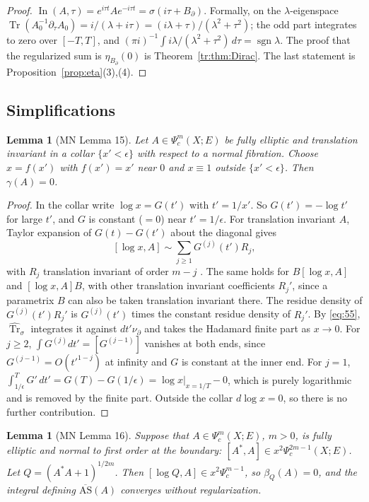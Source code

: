\documentclass[11pt,oneside,reqno]{article}
\DeclareMathOperator{\Tr}{Tr}
\DeclareMathOperator{\In}{In}
\DeclareMathOperator{\sgn}{sgn}
\newcommand{\Psic}{\Psi_{c}}
\newcommand{\hTrs}{\widehat{\Tr}_\sigma}
\newcommand{\lQ}{\log Q}
\newcommand{\lx}{\log x}
\newcommand{\bAS}{\overline{\mathrm{AS}}}
\theoremstyle{plain}
\newtheorem{lemma}[theorem]{Lemma}
\theoremstyle{definition}
\theoremstyle{remark}
\begin{document}
\begin{proof}
\(\In(A,\tau)=e^{i\tau t}Ae^{-i\tau t}=\sigma(i\tau+B_\partial)\). Formally,
on the \(\lambda\)-eigenspace
\(\Tr(A_0^{-1}\partial_\tau A_0)=i/(\lambda+i\tau)=(i\lambda+\tau)/
(\lambda^2+\tau^2)\); the odd part integrates to zero over \([-T,T]\), and
\((\pi i)^{-1}\int i\lambda/(\lambda^2+\tau^2)\,d\tau=\sgn\lambda\). The
proof that the regularized sum is \(\eta_{B_\partial}(0)\) is
Theorem~\ref{tr:thm:Dirac}. The last statement is
Proposition~\ref{prop:eta}(3),(4).
\end{proof}

\subsection{Simplifications}

\begin{lemma}[MN Lemma 15]\label{lem:gamma}
Let \(A\in\Psic^m(X;E)\) be fully elliptic and translation invariant in a
collar \(\{x'<\epsilon\}\) with respect to a normal fibration. Choose
\(x=f(x')\) with \(f(x')=x'\) near \(0\) and \(x\equiv1\) outside
\(\{x'<\epsilon\}\). Then \(\gamma(A)=0\).
\end{lemma}

\begin{proof}
In the collar write \(\log x=G(t')\) with \(t'=1/x'\). So
\(G(t')=-\log t'\) for large \(t'\), and \(G\) is constant (\(=0\)) near
\(t'=1/\epsilon\). For translation invariant \(A\), Taylor expansion of
\(G(t)-G(t')\) about the diagonal gives
\[
 [\lx,A]\sim\sum_{j\ge1}G^{(j)}(t')R_j ,
\]
with \(R_j\) translation invariant of order \(m-j\) \cite[p.~32]{MN}. The
same holds for \(B[\lx,A]\) and \([\lx,A]B\), with other translation
invariant coefficients \(R_j'\), since a parametrix \(B\) can also be
taken translation invariant there. The residue density of
\(G^{(j)}(t')R_j'\) is \(G^{(j)}(t')\) times the constant residue density
of \(R_j'\). By \eqref{eq:55}, \(\hTrs\) integrates it against
\(dt'\nu_\partial\) and takes the Hadamard finite part as \(x\to0\). For
\(j\ge2\), \(\int G^{(j)}dt'=[G^{(j-1)}]\) vanishes at both ends, since
\(G^{(j-1)}=O(t'^{1-j})\) at infinity and \(G\) is constant at the inner
end. For \(j=1\), \(\int_{1/\epsilon}^{T}G'\,dt'=G(T)-G(1/\epsilon)=
\log x|_{x=1/T}-0\), which is purely logarithmic and is removed by the
finite part. Outside the collar \(d\log x=0\), so there is no further
contribution.
\end{proof}

\begin{lemma}[MN Lemma 16]\label{lem:betaQ}
Suppose that \(A\in\Psic^m(X;E)\), \(m>0\), is fully elliptic and normal to
first order at the boundary: \([A^*,A]\in x^2\Psic^{2m-1}(X;E)\). Let
\(Q=(A^*A+1)^{1/2m}\). Then \([\lQ,A]\in x^2\Psic^{m-1}\), so
\(\beta_Q(A)=0\), and the integral defining \(\bAS(A)\) converges without
regularization.
\end{lemma}
\end{document}
